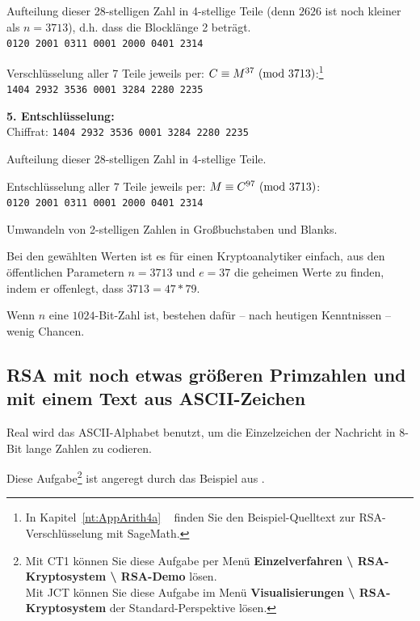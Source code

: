 \begin{refsegment}
\noindent Aufteilung dieser 28-stelligen Zahl in 4-stellige Teile (denn $2626$ ist noch kleiner als $n=3713$), d.h. dass
die Blocklänge 2 beträgt.\\
{\tt 0120 2001 0311 0001 2000 0401 2314}

\label{SrcArith4a}
\noindent Verschlüsselung aller 7 Teile jeweils per: $C \equiv M^{37}{\rm ~(mod~3713)}$:\footnote{%
  In Kapitel~\ref{nt:AppArith4a} \glqq {}\grqq~
  finden Sie den Beispiel-Quelltext zur RSA-Verschlüsselung mit SageMath.
}\\
{\tt 1404 2932 3536 0001 3284 2280 2235}

\noindent \textbf{5. Entschlüsselung:}\\
Chiffrat: {\tt 1404 2932 3536 0001 3284 2280 2235 }

\noindent Aufteilung dieser 28-stelligen Zahl in 4-stellige Teile.

\noindent Entschlüsselung aller $7$ Teile jeweils per: $M \equiv C^{97}{\rm ~(mod~}3713)$:\\
{\tt 0120 2001 0311 0001 2000 0401 2314}

\noindent Umwandeln von 2-stelligen Zahlen in Großbuchstaben und Blanks.

\noindent Bei den gewählten Werten ist es für einen Kryptoanalytiker
 einfach, aus den öffentlichen Parametern
$n=3713$ und $e=37$ die geheimen Werte zu finden, indem
er offenlegt, dass $3713 = 47 * 79$.

\noindent Wenn $n$ eine $1024$-Bit-Zahl ist, bestehen dafür -- nach heutigen
Kenntnissen -- wenig Chancen.


\subsection[RSA mit noch etwas größeren Primzahlen und ASCII-Zeichen]
           {RSA mit noch etwas größeren Primzahlen und mit einem Text aus ASCII-Zeichen}

Real wird das ASCII-Alphabet benutzt, um die Einzelzeichen der Nachricht in
8-Bit lange Zahlen zu codieren.

\noindent Diese Aufgabe\footnote{%
Mit CT1 können Sie diese Aufgabe per Menü
  \textbf{Einzelverfahren \textbackslash{} RSA-Kryptosystem \textbackslash{}
  RSA-Demo} lösen.\\
  Mit JCT können Sie diese Aufgabe im Menü
  \textbf{Visualisierungen \textbackslash{} RSA-Kryptosystem}
  der Standard-Perspektive lösen.%
}
ist angeregt durch das Beispiel aus \cite[S. 271]{Eckert2014}.


\end{refsegment}
